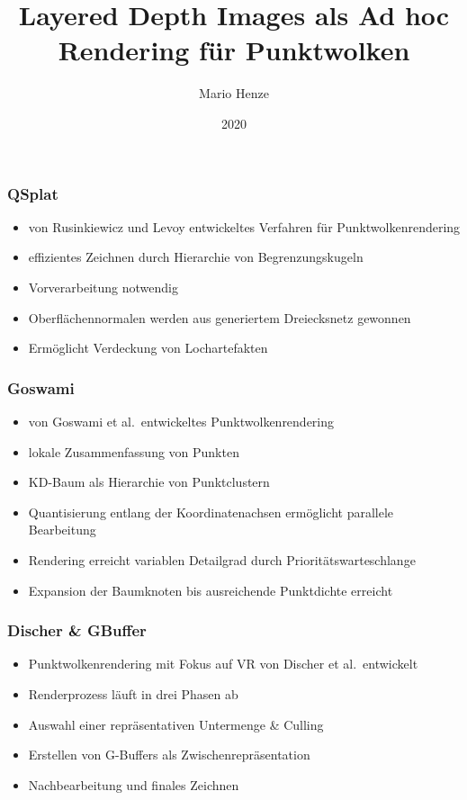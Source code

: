 \documentclass[aspectratio=169]{beamer}
\title{Layered Depth Images als Ad hoc Rendering für Punktwolken}
\author{Mario Henze}
\institute{Professur für Computergrafik und Visualisierung}
\date{2020}
\begin{document}
\frame{\titlepage}

\begin{frame}
    \frametitle{QSplat}
    \begin{itemize}
        \item von Rusinkiewicz und Levoy entwickeltes Verfahren für Punktwolkenrendering
        \item effizientes Zeichnen durch Hierarchie von Begrenzungskugeln
        \item Vorverarbeitung notwendig
        \item Oberflächennormalen werden aus generiertem Dreiecksnetz gewonnen
        \item Ermöglicht Verdeckung von Lochartefakten
    \end{itemize}
\end{frame}

\begin{frame}
    \frametitle{Goswami}
    \begin{itemize}
        \item von Goswami et al.\ entwickeltes Punktwolkenrendering
        \item lokale Zusammenfassung von Punkten
        \item KD-Baum als Hierarchie von Punktclustern
        \item Quantisierung entlang der Koordinatenachsen ermöglicht parallele Bearbeitung
        \item Rendering erreicht variablen Detailgrad durch Prioritätswarteschlange
        \item Expansion der Baumknoten bis ausreichende Punktdichte erreicht
    \end{itemize}
\end{frame}

\begin{frame}
    \frametitle{Discher \& GBuffer}
    \begin{itemize}
        \item Punktwolkenrendering mit Fokus auf VR von Discher et al.\ entwickelt
        \item Renderprozess läuft in drei Phasen ab
        \item Auswahl einer repräsentativen Untermenge \& Culling
        \item Erstellen von G-Buffers als Zwischenrepräsentation
        \item Nachbearbeitung und finales Zeichnen
    \end{itemize}
\end{frame}
\end{document}
